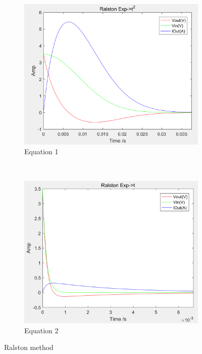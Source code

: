 \documentclass[a4paper, 12pt]{article}
\begin{document}
\begin{figure}[h]
      \centering
      \begin{subfigure}[b]{0.4\textwidth}
            \includegraphics[width=\textwidth]{ex1/ralston_t_sqr.PNG}
            \caption{Equation 1}
      \end{subfigure}
      ~
      \begin{subfigure}[b]{0.4\textwidth}
            \includegraphics[width=\textwidth]{ex1/ralston_t.PNG}
            \caption{Equation 2}
      \end{subfigure}
      \caption{Ralston method}
\end{figure}
\end{document}
